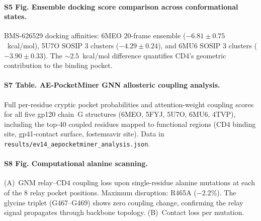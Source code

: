 \documentclass[11pt,a4paper]{article}
\begin{document}
\paragraph{S5 Fig. Ensemble docking score comparison across conformational states.} BMS-626529 docking affinities: 6MEO 20-frame ensemble ($-6.81 \pm 0.75$~kcal/mol), 5U7O SOSIP 3 clusters ($-4.29 \pm 0.24$), and 6MU6 SOSIP 3 clusters ($-3.90 \pm 0.33$). The ${\sim}2.5$~kcal/mol difference quantifies CD4's geometric contribution to the binding pocket.


\paragraph{S7 Table. AE-PocketMiner GNN allosteric coupling analysis.} Full per-residue cryptic pocket probabilities and attention-weight coupling scores for all five gp120 chain~G structures (6MEO, 5FYJ, 5U7O, 6MU6, 4TVP), including the top-40 coupled residues mapped to functional regions (CD4 binding site, gp41-contact surface, fostemsavir site). Data in \texttt{results/ev14\_aepocketminer\_analysis.json}.

\paragraph{S8 Fig. Computational alanine scanning.} (A)~GNM relay--CD4 coupling loss upon single-residue alanine mutations at each of the 8 relay pocket positions. Maximum disruption: R465A ($-2.2$\%). The glycine triplet (G467--G469) shows zero coupling change, confirming the relay signal propagates through backbone topology. (B)~Contact loss per mutation.

\begingroup
\small
\setlength{\bibsep}{0.4em}
\end{document}
